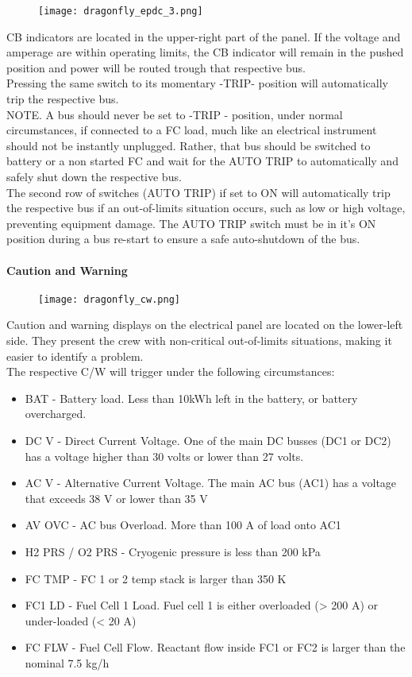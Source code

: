 \documentclass[Orbiter User Manual.tex]{subfiles}
\begin{document}
\begin{figure}[H]
  \centering
  \texttt{[image: dragonfly\_epdc\_3.png]}
\end{figure}

\noindent
CB indicators are located in the upper-right part of the panel. If the voltage and amperage are within operating limits, the CB indicator will remain in the pushed position and power will be routed trough that respective bus.\\
Pressing the same switch to its momentary -TRIP- position will automatically trip the respective bus.\\
NOTE. A bus should never be set to -TRIP - position, under normal circumstances, if connected to a FC load, much like an electrical instrument should not be instantly unplugged. Rather, that bus should be switched to battery or a non started FC and wait for the AUTO TRIP to automatically and safely shut down the respective bus.\\
The second row of switches (AUTO TRIP) if set to ON will automatically trip the respective bus if an out-of-limits situation occurs, such as low or high voltage, preventing equipment damage. The AUTO TRIP switch must be in it's ON position during a bus re-start to ensure a safe auto-shutdown of the bus.

\paragraph{Caution and Warning}

\begin{figure}[H]
  \centering
  \texttt{[image: dragonfly\_cw.png]}
\end{figure}

Caution and warning displays on the electrical panel are located on the lower-left side. They present the crew with non-critical out-of-limits situations, making it easier to identify a problem.\\
The respective C/W will trigger under the following circumstances:

\begin{itemize}
\item BAT - Battery load. Less than 10kWh left in the battery, or battery overcharged.
\item DC V - Direct Current Voltage. One of the main DC busses (DC1 or DC2) has a voltage higher than 30 volts or lower than 27 volts.
\item AC V - Alternative Current Voltage. The main AC bus (AC1) has a voltage that exceeds 38 V or lower than 35 V
\item AV OVC - AC bus Overload. More than 100 A of load onto AC1
\item H2 PRS / O2 PRS - Cryogenic pressure is less than 200 kPa
\item FC TMP - FC 1 or 2 temp stack is larger than 350 K
\item FC1 LD - Fuel Cell 1 Load. Fuel cell 1 is either overloaded (> 200 A) or under-loaded (< 20 A)
\item FC FLW - Fuel Cell Flow. Reactant flow inside FC1 or FC2 is larger than the nominal 7.5 kg/h
\end{itemize}
\end{document}
